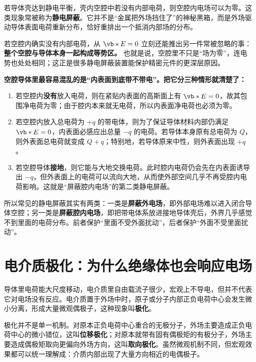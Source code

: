 \documentclass[lang=cn,11pt]{elegantbook}
\begin{document}
若导体壳达到静电平衡，壳内空腔中若没有内部电荷，则空腔内电场可以为零。这类现象常被称为\textbf{静电屏蔽}。它并不是“金属把外场挡住了”的神秘黑箱，而是外场驱动导体表面电荷重新分布，恰好重排出一个抵消内部场的分布。

\begin{remark}
若空腔内确实没有内部电荷，从 \(\vb*{E}=0\) 立刻还能推出另一件常被忽略的事：\textbf{整个空腔与导体本身一起构成等势区。} 也就是说，空腔里不只是“场为零”，连电势也处处相同；这正是很多静电屏蔽装置能保护精密元件的更深层原因。
\end{remark}

\begin{note}
\textbf{空腔导体里最容易混乱的是“内表面到底带不带电”。把它分三种情形就清楚了：}
\begin{enumerate}
 \item 若空腔内\textbf{没有}放入电荷，则在紧贴内表面的高斯面上有 \(\vb*{E}=0\)，故其包围净电荷为零；由于腔内本来就无电荷，所以内表面净电荷也必须为零。
 \item 若空腔内放入总电荷为 \(+q\) 的带电体，则为了保证导体材料内部仍满足 \(\vb*{E}=0\)，内表面必感应出总量 \(-q\) 的电荷。若导体本身原有总电荷为 \(Q\)，则外表面总电荷就变成 \(Q+q\)；特别地，若导体原来中性，则外表面出现 \(+q\)。
 \item 若空腔导体\textbf{接地}，则它能与大地交换电荷。此时腔内电荷仍会先在内表面诱导出 \(-q\)，但外表面上的电荷可以流向大地，从而使外部空间几乎不再受腔内电荷影响。这就是“屏蔽腔内电场”的第二类静电屏蔽。
\end{enumerate}
\end{note}

\begin{remark}
所以常见的静电屏蔽其实有两类：一类是\textbf{屏蔽外电场}，即外部电场难以进入闭合导体空腔；另一类是\textbf{屏蔽腔内电场}，即把带电体系放进接地导体壳后，外界几乎感觉不到里面的电荷分布。前者保护“里面不受外面扰动”，后者保护“外面不受里面扰动”。
\end{remark}

\section{电介质极化：为什么绝缘体也会响应电场}

导体里电荷能大尺度移动，电介质里自由载流子很少，宏观上不导电，但并不代表它对电场没有反应。电介质置于外场中时，原子或分子内部正负电荷中心会发生微小分离，形成大量微观偶极子，这种现象叫\textbf{极化}。

极化并不是单一机制。对原本正负电荷中心重合的无极分子，外场主要造成正负电荷中心的微小错位，这叫\textbf{位移极化}；对原本就带有固有偶极矩的有极分子，外场主要造成偶极矩取向更偏向外场方向，这叫\textbf{取向极化}。虽然微观机制不同，但宏观效果都可以统一理解成：介质内部出现了大量方向相近的电偶极子。
\end{document}
